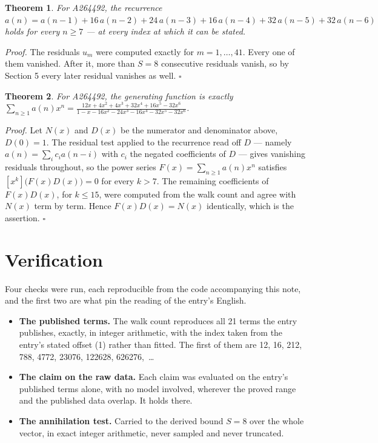 \documentclass[11pt]{article}
\newtheorem{theorem}{Theorem}
\theoremstyle{definition}
\begin{document}
\begin{theorem} For A264492, the recurrence $a(n) = a(n-1) + 16\,a(n-2) + 24\,a(n-3) + 16\,a(n-4) + 32\,a(n-5) + 32\,a(n-6)$ holds for every $n \ge 7$ --- at every index at which it can be stated.\end{theorem}

{\itshape Proof.} The residuals $u_m$ were computed exactly for $m = 1,\dots,41$. Every one of them vanished. After it, more than $S = 8$ consecutive residuals vanish, so by Section 5 every later residual vanishes as well. $\square$

\begin{theorem} For A264492, the generating function is exactly $\sum_{n\ge 1} a(n)x^n = \frac{12x + 4x^{2} + 4x^{3} + 32x^{4} + 16x^{5} - 32x^{6}}{1 - x - 16x^{2} - 24x^{3} - 16x^{4} - 32x^{5} - 32x^{6}}$.\end{theorem}

{\itshape Proof.} Let $N(x)$ and $D(x)$ be the numerator and denominator above, $D(0)=1$. The residual test applied to the recurrence read off $D$ --- namely $a(n) = \sum_i c_i a(n-i)$ with $c_i$ the negated coefficients of $D$ --- gives vanishing residuals throughout, so the power series $F(x)=\sum_{n\ge 1}a(n)x^n$ satisfies $[x^k]\bigl(F(x)D(x)\bigr) = 0$ for every $k > 7$. The remaining coefficients of $F(x)D(x)$, for $k \le 15$, were computed from the walk count and agree with $N(x)$ term by term. Hence $F(x)D(x) = N(x)$ identically, which is the assertion. $\square$

\section{Verification}

Four checks were run, each reproducible from the code accompanying this note, and the first two are what pin the reading of the entry's English.

\begin{itemize}

\item {\bfseries The published terms.} The walk count reproduces all 21 terms the entry publishes, exactly, in integer arithmetic, with the index taken from the entry's stated offset (1) rather than fitted. The first of them are 12, 16, 212, 788, 4772, 23076, 122628, 626276,~\dots

\item {\bfseries The claim on the raw data.} Each claim was evaluated on the entry's published terms alone, with no model involved, wherever the proved range and the published data overlap. It holds there.

\item {\bfseries The annihilation test.} Carried to the derived bound $S = 8$ over the whole vector, in exact integer arithmetic, never sampled and never truncated.

\end{itemize}
\end{document}
